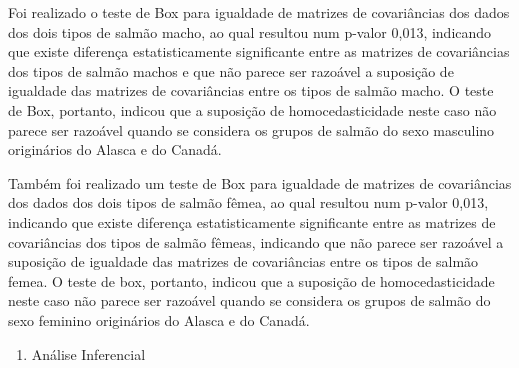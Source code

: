\documentclass[10pt,portuguese,]{article}
\providecommand{\tightlist}{%
  \setlength{\itemsep}{0pt}\setlength{\parskip}{0pt}}
\begin{document}
Foi realizado o teste de Box para igualdade de matrizes de covariâncias
dos dados dos dois tipos de salmão macho, ao qual resultou num p-valor
0,013, indicando que existe diferença estatisticamente significante
entre as matrizes de covariâncias dos tipos de salmão machos e que não
parece ser razoável a suposição de igualdade das matrizes de
covariâncias entre os tipos de salmão macho. O teste de Box, portanto,
indicou que a suposição de homocedasticidade neste caso não parece ser
razoável quando se considera os grupos de salmão do sexo masculino
originários do Alasca e do Canadá.

Também foi realizado um teste de Box para igualdade de matrizes de
covariâncias dos dados dos dois tipos de salmão fêmea, ao qual resultou
num p-valor 0,013, indicando que existe diferença estatisticamente
significante entre as matrizes de covariâncias dos tipos de salmão
fêmeas, indicando que não parece ser razoável a suposição de igualdade
das matrizes de covariâncias entre os tipos de salmão femea. O teste de
box, portanto, indicou que a suposição de homocedasticidade neste caso
não parece ser razoável quando se considera os grupos de salmão do sexo
feminino originários do Alasca e do Canadá.

\newpage

\vspace{0.5cm}

\begin{enumerate}
\def\labelenumi{\arabic{enumi}.}
\setcounter{enumi}{2}
\tightlist
\item
  Análise Inferencial
\end{enumerate}

\vspace{0.5cm}
\end{document}
